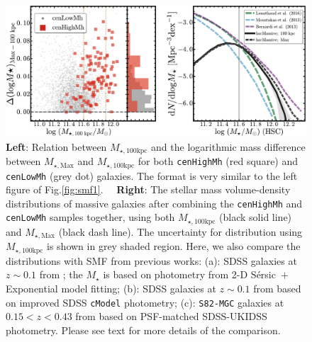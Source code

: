 \documentclass{emulateapj}
\def\ser{{S\'{e}rsic\ }}
\def\rbcg{\texttt{cenHighMh}}
\def\nbcg{\texttt{cenLowMh}}
\def\mstar{{$M_{\star}$}}
\def\mtot{{$M_{\star,100\mathrm{kpc}}$}}
\def\mmax{{$M_{\star,\mathrm{Max}}$}}
\newcommand{\update}[1]{\textcolor{Bittersweet}{#1}}
\begin{document}
\begin{CJK*}{UTF8}{gbsn}
  \begin{figure}[t]
      \centering 
      \includegraphics[width=\textwidth]{fig/redbcg_discussion_5}
      \caption{
      \update{
          \textbf{Left}: Relation between \mtot{} and the logarithmic mass difference 
          between \mmax{} and \mtot{} for both \rbcg{} (red square) and \nbcg{} 
          (grey dot) galaxies.  The format is very similar to the left figure of 
          Fig.\ref{fig:smf1}.~~
          \textbf{Right}: The stellar mass volume-density distributions of massive galaxies 
          after combining the \rbcg{} and \nbcg{} samples together, using both 
          \mtot{} (black solid line) and \mmax{} (black dash line). 
          The uncertainty for distribution using \mtot{} is shown in grey shaded region.  
          Here, we also compare the distributions with SMF from previous works: 
          (a): SDSS galaxies at $z\sim 0.1$ from \citet{Bernardi2013}; the \mstar{} is 
          based on photometry from 2-D \ser{}$+$Exponential model fitting; 
          (b): SDSS galaxies at $z\sim 0.1$ from \citet{Moustakas13} based on 
          improved SDSS \texttt{cModel} photometry; 
          (c): \texttt{S82-MGC} galaxies at $0.15 < z< 0.43$ from 
          \citet{Leauthaud2016} based on PSF-matched SDSS-UKIDSS photometry.
          Please see text for more details of the comparison.
          }}
      \label{fig:discussion_1}
  \end{figure}


\end{CJK*}
\end{document}
